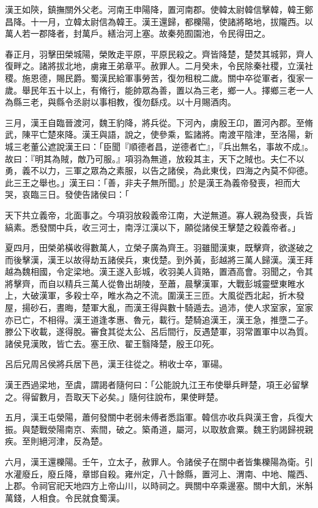 \begin{pinyinscope}
漢王如陝，鎮撫關外父老。河南王申陽降，置河南郡。使韓太尉韓信擊韓，韓王鄭昌降。十一月，立韓太尉信為韓王。漢王還歸，都櫟陽，使諸將略地，拔隴西。以萬人若一郡降者，封萬戶。繕治河上塞。故秦苑囿園池，令民得田之。

春正月，羽擊田榮城陽，榮敗走平原，平原民殺之。齊皆降楚，楚焚其城郭，齊人復畔之。諸將拔北地，虜雍王弟章平。赦罪人。二月癸未，令民除秦社稷，立漢社稷。施恩德，賜民爵。蜀漢民給軍事勞苦，復勿租稅二歲。關中卒從軍者，復家一歲。舉民年五十以上，有脩行，能帥眾為善，置以為三老，鄉一人。擇鄉三老一人為縣三老，與縣令丞尉以事相教，復勿繇戍。以十月賜酒肉。

三月，漢王自臨晉渡河，魏王豹降，將兵從。下河內，虜殷王卬，置河內郡。至脩武，陳平亡楚來降。漢王與語，說之，使參乘，監諸將。南渡平陰津，至洛陽，新城三老董公遮說漢王曰：「臣聞『順德者昌，逆德者亡』，『兵出無名，事故不成』。故曰：『明其為賊，敵乃可服。』項羽為無道，放殺其主，天下之賊也。夫仁不以勇，義不以力，三軍之眾為之素服，以告之諸侯，為此東伐，四海之內莫不仰德。此三王之舉也。」漢王曰：「善，非夫子無所聞。」於是漢王為義帝發喪，袒而大哭，哀臨三日。發使告諸侯曰：「

天下共立義帝，北面事之。今項羽放殺義帝江南，大逆無道。寡人親為發喪，兵皆縞素。悉發關中兵，收三河士，南浮江漢以下，願從諸侯王擊楚之殺義帝者。」

夏四月，田榮弟橫收得數萬人，立榮子廣為齊王。羽雖聞漢東，既擊齊，欲遂破之而後擊漢，漢王以故得劫五諸侯兵，東伐楚。到外黃，彭越將三萬人歸漢。漢王拜越為魏相國，令定梁地。漢王遂入彭城，收羽美人貨賂，置酒高會。羽聞之，令其將擊齊，而自以精兵三萬人從魯出胡陵，至蕭，晨擊漢軍，大戰彭城靈壁東睢水上，大破漢軍，多殺士卒，睢水為之不流。圍漢王三匝。大風從西北起，折木發屋，揚砂石，晝晦，楚軍大亂，而漢王得與數十騎遁去。過沛，使人求室家，室家亦已亡，不相得。漢王道逢孝惠、魯元，載行。楚騎追漢王，漢王急，推墮二子。滕公下收載，遂得脫。審食其從太公、呂后間行，反遇楚軍，羽常置軍中以為質。諸侯見漢敗，皆亡去。塞王欣、翟王翳降楚，殷王卬死。

呂后兄周呂侯將兵居下邑，漢王往從之。稍收士卒，軍碭。

漢王西過梁地，至虞，謂謁者隨何曰：「公能說九江王布使舉兵畔楚，項王必留擊之。得留數月，吾取天下必矣。」隨何往說布，果使畔楚。

五月，漢王屯滎陽，蕭何發關中老弱未傅者悉詣軍。韓信亦收兵與漢王會，兵復大振。與楚戰滎陽南京、索間，破之。築甬道，屬河，以取敖倉粟。魏王豹謁歸視親疾。至則絕河津，反為楚。

六月，漢王還櫟陽。壬午，立太子，赦罪人。令諸侯子在關中者皆集櫟陽為衛。引水灌廢丘，廢丘降，章邯自殺。雍州定，八十餘縣，置河上、渭南、中地、隴西、上郡。令祠官祀天地四方上帝山川，以時祠之。興關中卒乘邊塞。關中大飢，米斛萬錢，人相食。令民就食蜀漢。


\end{pinyinscope}
